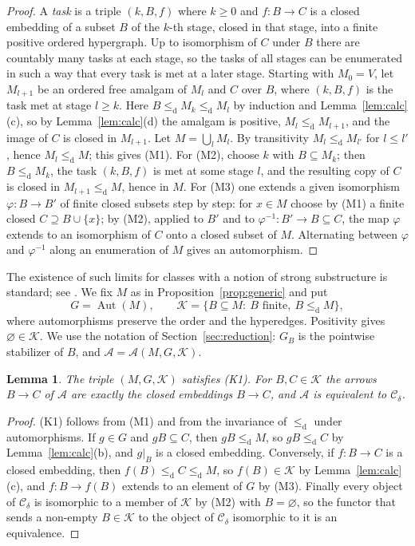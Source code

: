 \documentclass[11pt,a4paper]{article}
\newtheorem{lemma}[theorem]{Lemma}
\theoremstyle{definition}
\newcommand{\Cd}{\mathcal{C}_{\delta}}
\newcommand{\cle}{\leq_{\mathrm{d}}}
\newcommand{\Aut}{\operatorname{Aut}}
\newcommand{\K}{\mathcal{K}}
\begin{document}
\begin{proof}
A \emph{task} is a triple $(k,B,f)$ where $k\ge 0$ and $f\colon B\to C$ is a
closed embedding of a subset $B$ of the $k$-th stage, closed in that stage,
into a finite positive ordered hypergraph. Up to isomorphism of $C$ under $B$
there are countably many tasks at each stage, so the tasks of all stages can
be enumerated in such a way that every task is met at a later stage. Starting
with $M_0=V$, let $M_{l+1}$ be an ordered free amalgam of $M_l$ and $C$ over
$B$, where $(k,B,f)$ is the task met at stage $l\ge k$. Here $B\cle M_k\cle M_l$
by induction and Lemma~\ref{lem:calc}(c), so by Lemma~\ref{lem:calc}(d) the
amalgam is positive, $M_l\cle M_{l+1}$, and the image of $C$ is closed in
$M_{l+1}$. Let $M=\bigcup_l M_l$. By transitivity $M_l\cle M_{l'}$ for
$l\le l'$, hence $M_l\cle M$; this gives (M1). For (M2), choose $k$ with
$B\subseteq M_k$; then $B\cle M_k$, the task
$(k,B,f)$ is met at some stage $l$, and the resulting copy of $C$ is closed in
$M_{l+1}\cle M$, hence in $M$. For (M3) one extends a given isomorphism
$\varphi\colon B\to B'$ of finite closed subsets step by step: for $x\in M$
choose by (M1) a finite closed $C\supseteq B\cup\{x\}$; by (M2), applied to
$B'$ and to $\varphi^{-1}\colon B'\to B\subseteq C$, the map $\varphi$ extends to
an isomorphism of $C$ onto a closed subset of $M$. Alternating between
$\varphi$ and $\varphi^{-1}$ along an enumeration of $M$ gives an automorphism.
\end{proof}

The existence of such limits for classes with a notion of strong
substructure is standard; see
\cite[Theorem~2.6]{EHN}. We fix $M$ as in Proposition~\ref{prop:generic} and put
\[
 G=\Aut(M),\qquad \K=\{B\subseteq M:\ B \text{ finite},\ B\cle M\},
\]
where automorphisms preserve the order and the hyperedges. Positivity gives
$\varnothing\in\K$. We use the notation of Section~\ref{sec:reduction}:
$G_B$ is the pointwise stabilizer of $B$, and $\mathcal A=\mathcal A(M,G,\K)$.

\begin{lemma}\label{lem:AMequiv}
The triple $(M,G,\K)$ satisfies \textup{(K1)}. For $B,C\in\K$ the arrows
$B\to C$ of $\mathcal A$ are exactly the closed embeddings $B\to C$, and
$\mathcal A$ is equivalent to $\Cd$.
\end{lemma}

\begin{proof}
(K1) follows from (M1) and from the invariance of $\cle$ under automorphisms.
If $g\in G$ and $gB\subseteq C$, then $gB\cle M$, so $gB\cle C$ by
Lemma~\ref{lem:calc}(b), and $g|_B$ is a closed embedding. Conversely, if
$f\colon B\to C$ is a closed embedding, then $f(B)\cle C\cle M$, so
$f(B)\in\K$ by Lemma~\ref{lem:calc}(c), and $f\colon B\to f(B)$ extends to an
element of $G$ by (M3). Finally every object of $\Cd$ is isomorphic to a member
of $\K$ by (M2) with $B=\varnothing$, so the functor that sends a non-empty
$B\in\K$ to the object of $\Cd$ isomorphic to it is an equivalence.
\end{proof}
\end{document}
